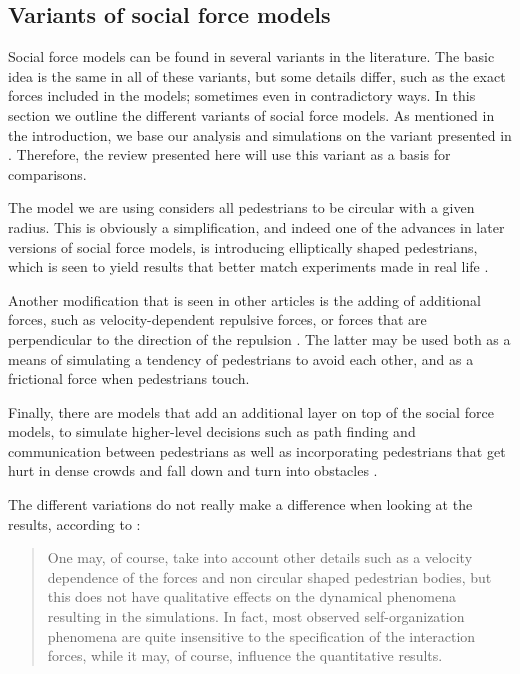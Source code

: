 \subsection{Variants of social force models}
Social force models can be found in several variants in the literature. The 
basic idea is the same in all of these variants, but some details differ, such 
as the exact forces included in the models; sometimes even in contradictory 
ways. In this section we outline the different variants of social force 
models. As mentioned in the introduction, we base our analysis and simulations 
on the variant presented in \cite{self-org}. Therefore, the review presented 
here will use this variant as a basis for comparisons.

The model we are using considers all pedestrians to be circular with a given 
radius. This is obviously a simplification, and indeed one of the advances in 
later versions of social force models, is introducing elliptically shaped 
pedestrians, which is seen to yield results that better match experiments made 
in real life \cite{ABconstant}.

Another modification that is seen in other articles is the adding of 
additional forces, such as velocity-dependent repulsive forces, or forces that 
are perpendicular to the direction of the repulsion 
\cite{helbing00,ABconstant}. The latter may be used 
both as a means of simulating a tendency of pedestrians to avoid each other, 
and as a frictional force when pedestrians touch.

Finally, there are models that add an additional layer on top of the social 
force models, to simulate higher-level decisions such as path finding and 
communication between pedestrians as well as incorporating pedestrians that 
get hurt in dense crowds and fall down and turn into obstacles \cite{HiDAC}.


The different variations do not really make a difference when looking at the 
results, according to \cite{self-org}:

\begin{quote}
    One may, of course, take into account other details such as a velocity 
    dependence of the forces and non circular shaped pedestrian bodies, but 
    this does not have qualitative effects on the dynamical phenomena 
    resulting in the simulations. In fact, most observed self-organization 
    phenomena are quite insensitive to the specification of the interaction 
    forces, while it may, of course, influence the quantitative results.
\end{quote}

